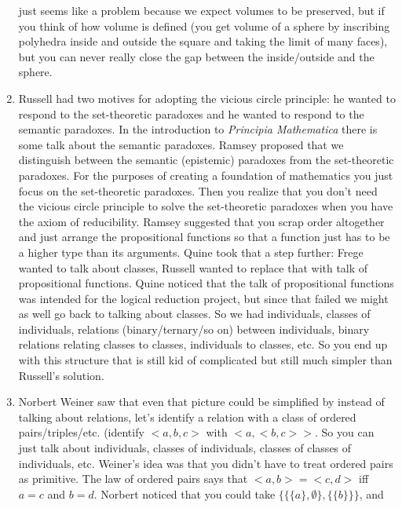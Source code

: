 \documentclass[12pt]{article}
\theoremstyle{definition}
\begin{document}
\begin{enumerate}
        just seems like a problem because we expect volumes to be preserved,
        but if you think of how volume is defined (you get volume of a sphere
        by inscribing polyhedra inside and outside the square and taking the
        limit of many faces), but you can never really close the gap between
        the inside/outside and the sphere. 
    \item
        Russell had two motives for adopting the vicious circle principle: he
        wanted to respond to the set-theoretic paradoxes and he wanted to
        respond to the semantic paradoxes. In the introduction to
        \textit{Principia Mathematica} there is some talk about the semantic
        paradoxes. Ramsey proposed that we distinguish between the semantic
        (epistemic) paradoxes from the set-theoretic paradoxes. For the
        purposes of creating a foundation of mathematics you just focus on the
        set-theoretic paradoxes. Then you realize that you don't need the
        vicious circle principle to solve the set-theoretic paradoxes when you
        have the axiom of reducibility. Ramsey suggested that you scrap order
        altogether and just arrange the propositional functions so that a
        function just has to be a higher type than its arguments. Quine took
        that a step further: Frege wanted to talk about classes, Russell wanted
        to replace that with talk of propositional functions. Quine noticed
        that the talk of propositional functions was intended for the logical
        reduction project, but since that failed we might as well go back to
        talking about classes. So we had individuals, classes of individuals,
        relations (binary/ternary/so on) between individuals, binary relations
        relating classes to classes, individuals to classes, etc. So you end up
        with this structure that is still kid of complicated but still much
        simpler than Russell's solution.
    \item
        Norbert Weiner saw that even that picture could be simplified by
        instead of talking about relations, let's identify a relation with a
        class of ordered pairs/triples/etc. (identify $<a, b, c>$ with $<a, <b,
        c>>$. So you can just talk about individuals, classes of individuals,
        classes of classes of individuals, etc. Weiner's idea was that you
        didn't have to treat ordered pairs as primitive. The law of ordered
        pairs says that $<a, b> = <c, d>$ iff $a = c$ and $b = d$. Norbert
        noticed that you could take $\{\{\{a\}, \emptyset\} , \{\{b\}\}\}$, and

\end{enumerate}
\end{document}
